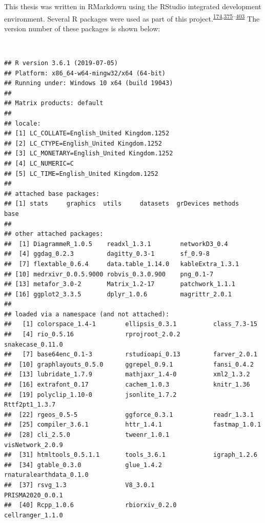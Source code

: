 \documentclass[a4paper, twoside]{templates/ociamthesis}
\begin{document}
This thesis was written in RMarkdown using the RStudio integrated development environment. Several R packages were used as part of this project.\textsuperscript{\protect\hyperlink{ref-R-metafor}{174},\protect\hyperlink{ref-R-base}{375}--\protect\hyperlink{ref-sf2018}{403}} The version number of these packages is shown below:

~

\begin{verbatim}
## R version 3.6.1 (2019-07-05)
## Platform: x86_64-w64-mingw32/x64 (64-bit)
## Running under: Windows 10 x64 (build 19043)
## 
## Matrix products: default
## 
## locale:
## [1] LC_COLLATE=English_United Kingdom.1252 
## [2] LC_CTYPE=English_United Kingdom.1252   
## [3] LC_MONETARY=English_United Kingdom.1252
## [4] LC_NUMERIC=C                           
## [5] LC_TIME=English_United Kingdom.1252    
## 
## attached base packages:
## [1] stats     graphics  utils     datasets  grDevices methods   base     
## 
## other attached packages:
##  [1] DiagrammeR_1.0.5    readxl_1.3.1        networkD3_0.4      
##  [4] ggdag_0.2.3         dagitty_0.3-1       sf_0.9-8           
##  [7] flextable_0.6.4     data.table_1.14.0   kableExtra_1.3.1   
## [10] medrxivr_0.0.5.9000 robvis_0.3.0.900    png_0.1-7          
## [13] metafor_3.0-2       Matrix_1.2-17       patchwork_1.1.1    
## [16] ggplot2_3.3.5       dplyr_1.0.6         magrittr_2.0.1     
## 
## loaded via a namespace (and not attached):
##   [1] colorspace_1.4-1        ellipsis_0.3.1          class_7.3-15           
##   [4] rio_0.5.16              rprojroot_2.0.2         snakecase_0.11.0       
##   [7] base64enc_0.1-3         rstudioapi_0.13         farver_2.0.1           
##  [10] graphlayouts_0.5.0      ggrepel_0.9.1           fansi_0.4.2            
##  [13] lubridate_1.7.9         mathjaxr_1.4-0          xml2_1.3.2             
##  [16] extrafont_0.17          cachem_1.0.3            knitr_1.36             
##  [19] polyclip_1.10-0         jsonlite_1.7.2          Rttf2pt1_1.3.7         
##  [22] rgeos_0.5-5             ggforce_0.3.1           readr_1.3.1            
##  [25] compiler_3.6.1          httr_1.4.1              fastmap_1.0.1          
##  [28] cli_2.5.0               tweenr_1.0.1            visNetwork_2.0.9       
##  [31] htmltools_0.5.1.1       tools_3.6.1             igraph_1.2.6           
##  [34] gtable_0.3.0            glue_1.4.2              rnaturalearthdata_0.1.0
##  [37] rsvg_1.3                V8_3.0.1                PRISMA2020_0.0.1       
##  [40] Rcpp_1.0.6              rbiorxiv_0.2.0          cellranger_1.1.0       

\end{verbatim}
\end{document}
